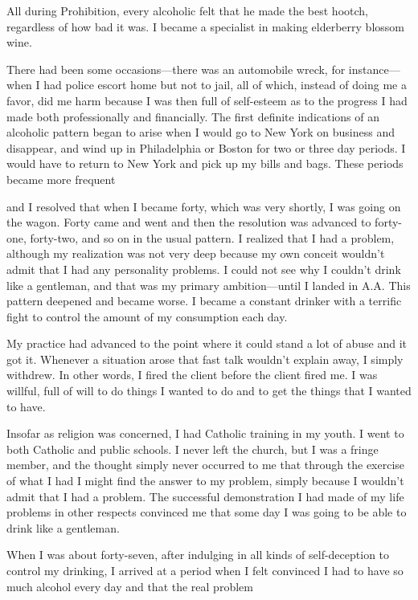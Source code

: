 \begin{biblechapter}
All during Prohibition, every alcoholic felt that he made the best hootch, regardless of how bad it was. I became a specialist in making elderberry blossom wine.

There had been some occasions—there was an automobile wreck, for instance—when I had police escort home but not to jail, all of which, instead of doing me a favor, did me harm because I was then full of self-esteem as to the progress I had made both professionally and financially. The first definite indications of an alcoholic pattern began to arise when I would go to New York on business and disappear, and wind up in Philadelphia or Boston for two or three day periods. I would have to return to New York and pick up my bills and bags. These periods became more frequent

and I resolved that when I became forty, which was very shortly, I was going on the wagon. Forty came and went and then the resolution was advanced to forty-one, forty-two, and so on in the usual pattern. I realized that I had a problem, although my realization was not very deep because my own conceit wouldn’t admit that I had any personality problems. I could not see why I couldn’t drink like a gentleman, and that was my primary ambition—until I landed in A.A. This pattern deepened and became worse. I became a constant drinker with a terrific fight to control the amount of my consumption each day.

My practice had advanced to the point where it could stand a lot of abuse and it got it. Whenever a situation arose that fast talk wouldn’t explain away, I simply withdrew. In other words, I fired the client before the client fired me. I was willful, full of will to do things I wanted to do and to get the things that I wanted to have.

Insofar as religion was concerned, I had Catholic training in my youth. I went to both Catholic and public schools. I never left the church, but I was a fringe member, and the thought simply never occurred to me that through the exercise of what I had I might find the answer to my problem, simply because I wouldn’t admit that I had a problem. The successful demonstration I had made of my life problems in other respects convinced me that some day I was going to be able to drink like a gentleman.

When I was about forty-seven, after indulging in all kinds of self-deception to control my drinking, I arrived at a period when I felt convinced I had to have so much alcohol every day and that the real problem


\end{biblechapter}
